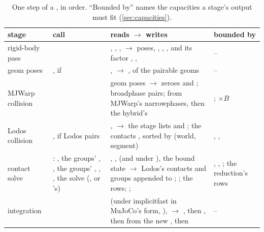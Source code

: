 \begin{table}[t]
\centering
\caption{One step of a , in order. ``Bounded by'' names the capacities a stage's output must fit (\cref{sec:capacities}).}
\label{tab:stages}
\small
\begin{tabularx}{\linewidth}{@{}L{22mm}L{36mm}YL{27mm}@{}}
\toprule
stage & call & reads $\to$ writes & bounded by \\
\midrule
rigid-body pass &  & , , ,  $\to$ poses, , , ,  and its factor , ,  & -- \\
geom poses & , if  & ,  $\to$ ,  of the pairable geoms & -- \\
MJWarp collision &  & geom poses $\to$ zeroes  and ; broadphase pairs;  from MJWarp's narrowphases, then the hybrid's & ;  $\times B$ \\
Lodos collision & , if Lodos pairs & ,  $\to$ the stage lists and ; the contacts , sorted by (world, segment) & , ,  \\
contact solve & : , the groups' , , the groups' , , , the solve (, or 's) & , ,  (and  under ), the bound state $\to$ Lodos's contacts and groups appended to ; ; the rows; ;  & , , ; the reduction's rows \\
integration &  &  (under implicitfast in MuJoCo's form, ),  $\to$ , then , then  from the new , then  & -- \\
\bottomrule
\end{tabularx}
\end{table}

